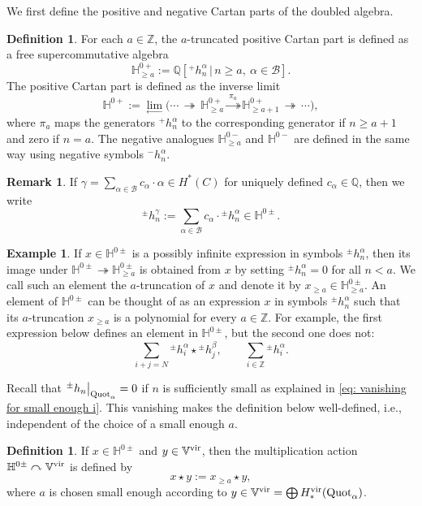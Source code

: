 \documentclass[10pt]{amsart}
\newcommand{\BZ}{\mathbb{Z}}
\newcommand{\BQ}{\mathbb{Q}}
\newcommand{\BH}{\mathbb{H}}
\newcommand{\BV}{\mathbb{V}}
\newcommand{\CB}{\mathcal{B}}
\newcommand{\Quot}{\textnormal{Quot}}
\newcommand{\+}{{}^+}
\newcommand{\vir}{\textnormal{vir}}
\theoremstyle{definition}
\newtheorem {example}[theorem]{Example}
\theoremstyle {definition}
\newtheorem{remark}[theorem]{Remark}
\theoremstyle {definition}
\newtheorem{definition}[theorem]{Definition}
\begin{document}
We first define the positive and negative Cartan parts of the doubled algebra.
\begin{definition}\label{def: Cartan}
For each $a\in \BZ$, the $a$-truncated positive Cartan part is defined as a free supercommutative algebra
$$\BH^{0+}_{\geq a}:=\BQ[{}^+h_n^{\alpha}\,|\,n\geq a,\ \alpha\in \CB]. 
$$
The positive Cartan part is defined as the inverse limit
$$\BH^{0+}:=\lim_{\longleftarrow}\Big(\cdots\,\twoheadrightarrow\, \BH^{0+}_{\geq a}\overset{\ \pi_a\ }{\twoheadrightarrow} \BH^{0+}_{\geq a+1}\,\twoheadrightarrow\,\cdots\Big),
$$
where $\pi_a$ maps the generators ${}^+h_n^{\alpha}$ to the corresponding generator if $n\geq a+1$ and zero if $n=a$. The negative analogues $\BH^{0-}_{\geq a}$ and $\BH^{0-}$ are defined in the same way using negative symbols ${}^-h_n^\alpha$. 
\end{definition}

\begin{remark}\label{rem: extend beyond the basis}
    If $\gamma=\sum_{\alpha\in \CB}c_\alpha\cdot \alpha\in H^*(C)$ for uniquely defined $c_\alpha\in \BQ$, then we write 
    $${}^\pm h_n^\gamma:=\sum_{\alpha\in \CB} c_\alpha\cdot {}^\pm h_n^\alpha\in \BH^{0\pm}.$$ 
\end{remark}

\begin{example}\label{ex: a-truncation}
If $x\in \BH^{0\pm}$ is a possibly infinite expression in symbols ${}^\pm h_n^\alpha$, then its image under $\BH^{0\pm}\twoheadrightarrow \BH^{0\pm}_{\geq a}$ is obtained from $x$ by setting ${}^\pm h_{n}^\alpha=0$ for all $n<a$. We call such an element the $a$-truncation of $x$ and denote it by $x_{\geq a}\in \BH^{0\pm}_{\geq a}$. An element of $\BH^{0\pm}$ can be thought of as an expression $x$ in symbols ${}^\pm h_n^\alpha$ such that its $a$-truncation $x_{\geq a}$ is a polynomial for every $a\in \BZ$. For example, the first expression below defines an element in $\BH^{0\pm}$, but the second one does not:
$$\sum_{i+j=N} {}^\pm h_i^\alpha\star {}^\pm h_j^\beta,\quad\quad \sum_{i\in \BZ}{}^\pm h_i^\alpha. 
$$
\end{example}

Recall that ${}^{\pm}h_n\big|_{\Quot_\alpha}=0$ if $n$ is sufficiently small as explained in \eqref{eq: vanishing for small enough i}. This vanishing makes the definition below well-defined, i.e., independent of the choice of a small enough $a$. 


\begin{definition}\label{def: Cartan part action via truncation}
    If $x\in \BH^{0\pm}$ and $y\in \BV^\vir$, then the multiplication action $\BH^{0\pm}\curvearrowright \BV^\vir$ is defined by
    $$x\star y:=x_{\geq a}\star y,
    $$
    where $a$ is chosen small enough according to $y\in \BV^\vir=\bigoplus H^\vir_*(\Quot_\alpha)$. 
\end{definition}
\end{document}
